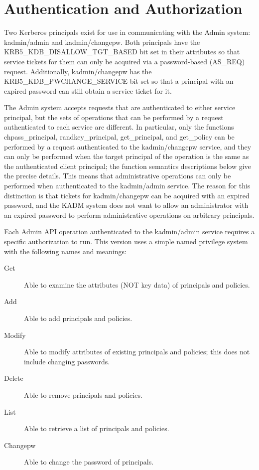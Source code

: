 \section{Authentication and Authorization}
\label{sec:auth}

Two Kerberos principals exist for use in communicating with the Admin
system: kadmin/admin and kadmin/changepw.  Both principals
have the KRB5_KDB_DISALLOW_TGT_BASED bit set in their attributes so
that service tickets for them can only be acquired via a
password-based (AS_REQ) request.  Additionally, kadmin/changepw
has the KRB5_KDB_PWCHANGE_SERVICE bit set so that a principal with an
expired password can still obtain a service ticket for it.

The Admin system accepts requests that are authenticated to either
service principal, but the sets of operations that can be performed by
a request authenticated to each service are different.  In particular,
only the functions chpass_principal, randkey_principal, get_principal,
and get_policy can be performed by a request authenticated to the
kadmin/changepw service, and they can only be performed when the
target principal of the operation is the same as the authenticated
client principal; the function semantics descriptions below give the
precise details.  This means that administrative operations can only
be performed when authenticated to the kadmin/admin service.  The
reason for this distinction is that tickets for kadmin/changepw can be
acquired with an expired password, and the KADM system does not want
to allow an administrator with an expired password to perform
administrative operations on arbitrary principals.

Each Admin API operation authenticated to the kadmin/admin service
requires a specific authorization to run.  This version uses a simple
named privilege system with the following names and meanings:

\begin{description}
\item[Get] Able to examine the attributes (NOT key data) of principals
and policies. 
\item[Add] Able to add principals and policies.
\item[Modify] Able to modify attributes of existing principals and
policies; this does not include changing passwords.
\item[Delete] Able to remove principals and policies.
\item[List] Able to retrieve a list of principals and policies.
\item[Changepw] Able to change the password of principals.
\end{description}

